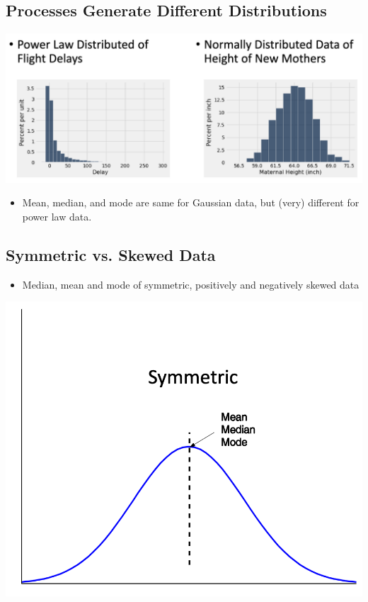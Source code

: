 \documentclass[11pt]{article}
\theoremstyle{definition}
\begin{document}
\subsection{Processes Generate Different Distributions}
\includegraphics[width=\textwidth]{11.png}
\begin{itemize}
    \item Mean, median, and mode are same for Gaussian data, but (very) different for power law data.
\end{itemize}
\subsection{Symmetric vs. Skewed Data}
\begin{itemize}
    \item Median, mean and mode of symmetric,
    positively and negatively skewed data
\end{itemize}

\includegraphics[width=\textwidth/4]{12.png}
\end{document}
